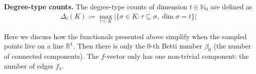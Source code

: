 \textbf{Degree-type counts.} The degree-type counts of dimension $t\in\mathbb{N}_0$ are defined as
\begin{align*}
    \Delta_t(K):=\max_{\tau\in K}|\{\sigma\in K:\tau\subseteq\sigma,\dim\sigma=t\}|
\end{align*}


\begin{Rem}
    Here we discuss how the functionals presented above simplify when the sampled points live on a line $\mathbb{R}^1$. Then there is only the $0$-th Betti number $\beta_0$ (the number of connected components). The $f$-vector only has one non-trivial component: the number of edges $f_1$.
\end{Rem}


